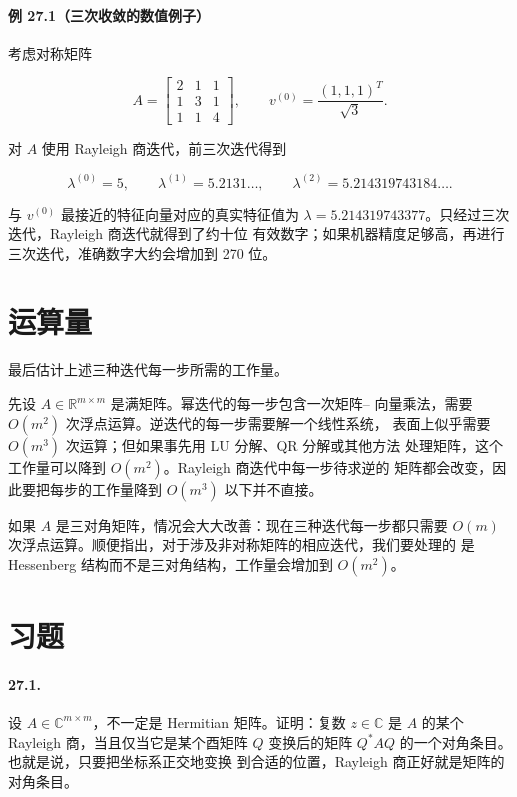 \documentclass[UTF8,fontset=none,12pt]{ctexart}
\begin{document}
\paragraph{例 27.1（三次收敛的数值例子）}
考虑对称矩阵

\[
A=\begin{bmatrix}
2&1&1\\
1&3&1\\
1&1&4
\end{bmatrix},
\qquad
v^{(0)}=\frac{(1,1,1)^T}{\sqrt3}.
\]

对 $A$ 使用 Rayleigh 商迭代，前三次迭代得到

\[
\lambda^{(0)}=5,\qquad
\lambda^{(1)}=5.2131\ldots,\qquad
\lambda^{(2)}=5.214319743184\ldots.
\]

与 $v^{(0)}$ 最接近的特征向量对应的真实特征值为
$\lambda=5.214319743377$。只经过三次迭代，Rayleigh 商迭代就得到了约十位
有效数字；如果机器精度足够高，再进行三次迭代，准确数字大约会增加到 270 位。

\section*{运算量}

最后估计上述三种迭代每一步所需的工作量。

先设 $A\in\mathbb{R}^{m\times m}$ 是满矩阵。幂迭代的每一步包含一次矩阵--
向量乘法，需要 $O(m^2)$ 次浮点运算。逆迭代的每一步需要解一个线性系统，
表面上似乎需要 $O(m^3)$ 次运算；但如果事先用 LU 分解、QR 分解或其他方法
处理矩阵，这个工作量可以降到 $O(m^2)$。Rayleigh 商迭代中每一步待求逆的
矩阵都会改变，因此要把每步的工作量降到 $O(m^3)$ 以下并不直接。

如果 $A$ 是三对角矩阵，情况会大大改善：现在三种迭代每一步都只需要
$O(m)$ 次浮点运算。顺便指出，对于涉及非对称矩阵的相应迭代，我们要处理的
是 Hessenberg 结构而不是三对角结构，工作量会增加到 $O(m^2)$。

\section*{习题}

\paragraph{27.1.}
设 $A\in\mathbb{C}^{m\times m}$，不一定是 Hermitian 矩阵。证明：复数
$z\in\mathbb{C}$ 是 $A$ 的某个 Rayleigh 商，当且仅当它是某个酉矩阵 $Q$
变换后的矩阵 $Q^*AQ$ 的一个对角条目。也就是说，只要把坐标系正交地变换
到合适的位置，Rayleigh 商正好就是矩阵的对角条目。
\end{document}

